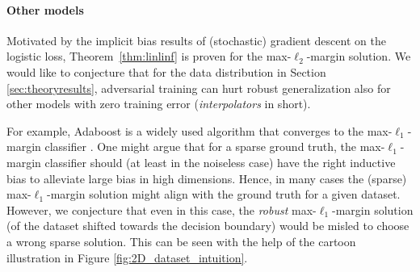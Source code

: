 \paragraph{Other models}
Motivated by the implicit bias results of (stochastic)
gradient descent on the logistic loss, Theorem~\ref{thm:linlinf} is proven for the max-$\ell_2$-margin
solution. We would like to conjecture
that for the data distribution in Section \ref{sec:theoryresults},
adversarial training can hurt robust generalization also for other models with zero
training error (\emph{interpolators} in short).

For example, Adaboost is a widely used algorithm that converges to the max-$\ell_1$-margin classifier \cite{telgarsky13}. One might argue that for a sparse ground truth, the max-$\ell_1$-margin classifier should (at least in the noiseless case) have the right inductive bias to alleviate large bias in high dimensions. Hence, in many cases the (sparse) max-$\ell_1$-margin solution might align with the ground
truth for a given dataset. However, we conjecture that even in this
case, the \emph{robust} max-$\ell_1$-margin solution (of the dataset
shifted towards the decision boundary) would be misled to choose a
wrong sparse solution. This can be seen with the help of the cartoon
illustration in Figure \ref{fig:2D_dataset_intuition}.





